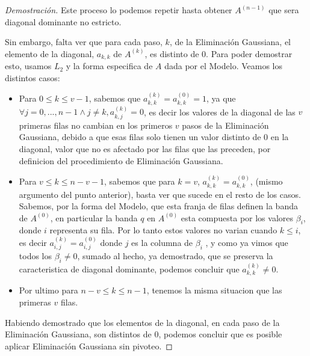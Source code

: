 \begin{proof}[Demostración]
Este proceso lo podemos repetir hasta obtener $A^{(n-1)}$ que sera diagonal dominante no estricto.

Sin embargo, falta ver que para cada paso, $k$, de la Eliminación Gaussiana, el elemento de la diagonal, $a_{k,k}$ de $A^{(k)}$, es distinto de 0.
Para poder demostrar esto, usamos $L_{2}$ y la forma especifica de $A$ dada por el Modelo. Veamos los distintos casos:

\begin{itemize}
  \item Para $0 \leq k \leq v-1$, sabemos que $a^{(k)}_{k,k} = a^{(0)}_{k,k} = 1$, ya que $\forall j=0,...,n-1 \land j \neq k, a^{(k)}_{k,j} = 0$,
  es decir los valores de la diagonal de las $v$ primeras filas no cambian en los primeros $v$ pasos de la Eliminación Gaussiana, debido a que
  esas filas solo tienen un valor distinto de 0 en la diagonal, valor que no es afectado por las filas que las preceden, por definicion del procedimiento de Eliminación Gaussiana.
  \item Para $v \leq k \leq n-v-1$, sabemos que para $k = v$, $a^{(k)}_{k,k} = a^{(0)}_{k,k}$, (mismo argumento del punto anterior), basta ver que sucede en el resto de los casos.
  Sabemos, por la forma del Modelo, que esta franja de filas definen la banda de $A^{(0)}$, en particular la banda $q$ en $A^{(0)}$ esta compuesta por los valores $\beta_{i}$, donde $i$ representa su fila.
  Por lo tanto estos valores no varian cuando $k \leq i$, es decir $a^{(k)}_{i,j} = a^{(0)}_{i,j}$ donde $j$ es la columna de $\beta_{i}$ , y como ya vimos que todos los $\beta_{i} \neq 0$, sumado al hecho, ya demostrado,
  que se preserva la caracteristica de diagonal dominante, podemos concluir que $a^{(k)}_{k,k} \neq 0$.
  \item Por ultimo para $n-v \leq k \leq n-1$, tenemos la misma situacion que las primeras $v$ filas.
\end{itemize}

Habiendo demostrado que los elementos de la diagonal, en cada paso de la Eliminación Gaussiana, son distintos de 0, podemos concluir que es posible aplicar Eliminación Gaussiana sin pivoteo.

\end{proof}


